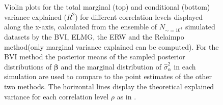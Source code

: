 \begin{figure}[H]
  \centering
  \hfill
  \caption[Marginal and conditional $R^2$ in Gaussian LMM]{Violin plots for the total marginal (top) and conditional (bottom) variance explained ($R^2$) for different correlation levels displayed along the x-axis, calculated from the ensemble of $N_{\sim=10^4}$ simulated datasets by the BVI, ELMG, the ERW and the Relaimpo method(only marginal variance explained can be computed). For the BVI method the posterior means of the sampled posterior distributions of $\boldsymbol{\beta}$ and the marginal distribution of $\hat{\sigma}^2_{\alpha}$ in each simulation are used to compare to the point estimates of the other two methods. The horizontal lines display the theoretical explained variance for each correlation level $\rho$ as in .}
  \label{fig:total_variance}
\end{figure}

